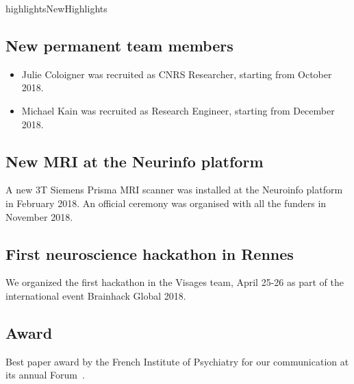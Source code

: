 \documentclass{ra2018}
\begin{document}

\begin{module}{highlights}{NewHighlights}{}

\subsection{New permanent team members}
\begin{itemize}
	\item Julie Coloigner was recruited as CNRS Researcher, starting from October 2018.
	\item Michael Kain was recruited as Research Engineer, starting from December 2018.
\end{itemize}

\subsection{New MRI at the Neurinfo platform}
A new 3T Siemens Prisma MRI scanner was installed at the Neuroinfo platform in February 2018. An official ceremony was organised with all the funders in November 2018.

\subsection{First neuroscience hackathon in Rennes}
We organized the first hackathon in the Visages team, April 25-26 as part of the international event Brainhack Global 2018.

\subsection{Award}
Best paper award by the French Institute of Psychiatry for our communication at its annual Forum~.





\end{module}
\end{document}
